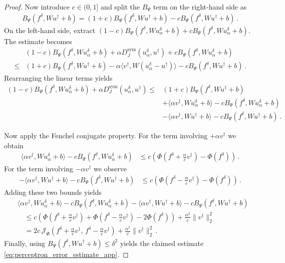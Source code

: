 \begin{proof}
Now introduce $c\in(0,1]$ and split the $B_\Psi$ term on the right-hand side as
\begin{align*}
    B_\Psi(f^\delta,Wu^\dagger+b) = (1+c)B_\Psi(f^\delta,Wu^\dagger+b) - cB_\Psi(f^\delta,Wu^\dagger+b) \, .
\end{align*}
On the left-hand side, extract $(1-c)B_\Psi(f^\delta,Wu_\alpha^\delta+b) + cB_\Psi(f^\delta,Wu_\alpha^\delta+b)$.  The estimate becomes
\begin{align*}
    &(1-c)B_\Psi(f^\delta,Wu_\alpha^\delta+b) + \alpha D_J^{\mathrm{sym}}(u_\alpha^\delta,u^\dagger) + cB_\Psi(f^\delta,Wu_\alpha^\delta+b) \\ 
    {} \le {} &(1+c)B_\Psi(f^\delta,Wu^\dagger+b) - \alpha\langle v^\dagger, W(u_\alpha^\delta-u^\dagger)\rangle - cB_\Psi(f^\delta,Wu^\dagger+b) \, .
\end{align*}
Rearranging the linear terms yields
\begin{align*}
    (1-c)B_\Psi(f^\delta,Wu_\alpha^\delta+b) + \alpha D_J^{\mathrm{sym}}(u_\alpha^\delta,u^\dagger) {} \le {} &(1+c)B_\Psi(f^\delta,Wu^\dagger+b) \\
    &+ \langle \alpha v^\dagger, Wu_\alpha^\delta+b \rangle - c B_\Psi(f^\delta,Wu_\alpha^\delta+b) \\
    &- \langle \alpha v^\dagger, Wu^\dagger+b \rangle - c B_\Psi(f^\delta,Wu^\dagger+b) \, .
\end{align*}

\noindent Now apply the Fenchel conjugate property. For the term involving $+\alpha v^\dagger$ we obtain
\begin{align*}
    \langle \alpha v^\dagger, Wu_\alpha^\delta+b \rangle - c B_\Psi(f^\delta,Wu_\alpha^\delta+b) &\le c \left( \Phi(f^\delta + \tfrac{\alpha}{c}v^\dagger) - \Phi(f^\delta) \right) \, .
\end{align*}
For the term involving $-\alpha v^\dagger$ we observe
\begin{align*}
    - \langle \alpha v^\dagger, Wu^\dagger+b \rangle - c B_\Psi(f^\delta,Wu^\dagger+b) &\le c \left( \Phi(f^\delta - \tfrac{\alpha}{c}v^\dagger) - \Phi(f^\delta) \right) \, .
\end{align*}
Adding these two bounds yields
\begin{align*}
    &\langle \alpha v^\dagger, Wu_\alpha^\delta+b \rangle - c B_\Psi(f^\delta,Wu_\alpha^\delta+b) - \langle \alpha v^\dagger, Wu^\dagger+b \rangle - c B_\Psi(f^\delta,Wu^\dagger+b) \\
    &\quad \le c \left( \Phi(f^\delta + \tfrac{\alpha}{c}v^\dagger) + \Phi(f^\delta - \tfrac{\alpha}{c}v^\dagger) - 2\Phi(f^\delta) \right) + \frac{\alpha^2}{c}\|v^\dagger\|_2^2 \\
    &\quad = 2c \,\mathcal{J}_{\Phi}\!\left(f^\delta+\frac{\alpha}{c}v^\dagger,\,f^\delta-\frac{\alpha}{c}v^\dagger\right) + \frac{\alpha^2}{c}\|v^\dagger\|_2^2 \, .
\end{align*}
Finally, using $B_\Psi(f^\delta,Wu^\dagger+b) \leq \delta^2$ yields the claimed estimate \eqref{eq:perceptron_error_estimate_app}.
\end{proof}

